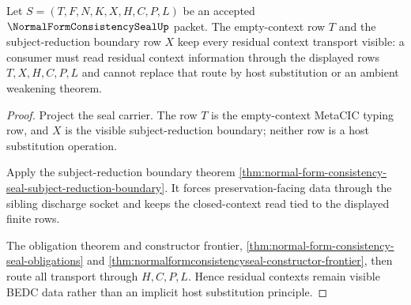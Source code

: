 \begin{theorem}
\label{thm:normal-form-consistency-seal-residual-context-obligation}
Let $S=(T,F,N,K,X,H,C,P,L)$ be an accepted
$\NormalFormConsistencySealUp$ packet. The empty-context row $T$ and the
subject-reduction boundary row $X$ keep every residual context transport
visible: a consumer must read residual context information through the
displayed rows $T,X,H,C,P,L$ and cannot replace that route by host
substitution or an ambient weakening theorem.
\end{theorem}
\begin{proof}
Project the seal carrier. The row $T$ is the empty-context MetaCIC typing row,
and $X$ is the visible subject-reduction boundary; neither row is a host
substitution operation.

Apply the subject-reduction boundary theorem
\autoref{thm:normal-form-consistency-seal-subject-reduction-boundary}. It
forces preservation-facing data through the sibling discharge socket and keeps
the closed-context read tied to the displayed finite rows.

The obligation theorem and constructor frontier,
\autoref{thm:normal-form-consistency-seal-obligations} and
\autoref{thm:normalformconsistencyseal-constructor-frontier}, then route all
transport through $H,C,P,L$. Hence residual contexts remain visible BEDC data
rather than an implicit host substitution principle.
\end{proof}

